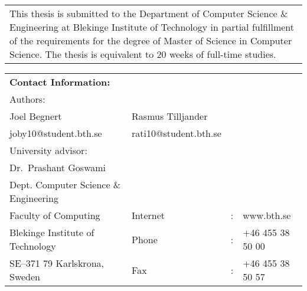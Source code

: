 \documentclass[a4paper,oneside]{bth}
\begin{document}
{\pagestyle{empty}
\changepage{5cm}{1cm}{-0.5cm}{-0.5cm}{}{-2cm}{}{}{}
\noindent%
\begin{tabular}{p{\textwidth}}
{\small This thesis is submitted to the Department of Computer Science \& Engineering at Blekinge
Institute of Technology in partial fulfillment of the requirements for the degree of Master
of Science in Computer Science. The thesis is equivalent to 20 weeks of
full-time studies.}
\end{tabular}

\par\vspace {12cm}

\noindent%
\begin{tabular}{p{}lcl}
\textbf{Contact Information:}\\
Authors:\\
Joel Begnert               & Rasmus Tilljander\\
joby10@student.bth.se      & rati10@student.bth.se\\
\par\vspace {5cm}
University advisor:\\
Dr.\ Prashant Goswami\\
Dept. Computer Science \& Engineering
\par\vspace {1cm}
\noindent%
 \\
Faculty of Computing & Internet & : & www.bth.se\\
Blekinge Institute of Technology & Phone	& : & +46 455 38 50 00 \\
SE--371 79 Karlskrona, Sweden & Fax & : & +46 455 38 50 57 \\
\end{tabular}
\clearpage
} %

\setcounter{page}{1}
\end{document}
